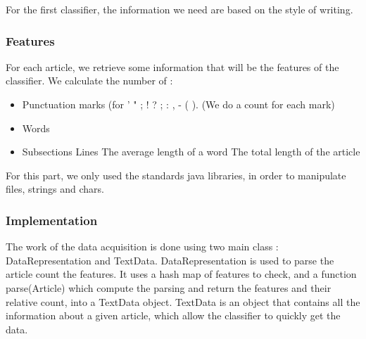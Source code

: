 For the first classifier, the information we need are based on the style of writing.

\subsubsection{Features}
\label{lab:data1}
For each article, we retrieve some information that will be the features of the classifier. We calculate the number of : 
\begin{itemize}
	\item Punctuation marks (for ' " ; ! ? ; : , - ( ). (We do a count for each mark)
	\item Words
	\item Subsections
	\line Lines
	\line The average length of a word
	\line The total length of the article
\end{itemize}

For this part, we only used the standards java libraries, in order to manipulate files, strings and chars. 

\subsubsection{Implementation}

The work of the data acquisition is done using two main class : DataRepresentation and TextData.
DataRepresentation is used to parse the article count the features. It uses a hash map of features to check, and a function parse(Article) which compute the parsing and return the features and their relative count, into a TextData object.
TextData is an object that contains all the information about a given article, which allow the classifier to quickly get the data. 
